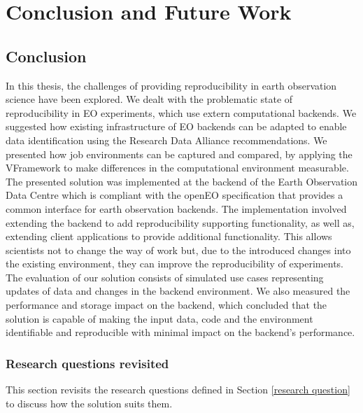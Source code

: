 \documentclass[draft,final]{vutinfth} %
\begin{document}
\chapter{Conclusion and Future Work}\label{Conclusion}

\section{Conclusion}

In this thesis, the challenges of providing reproducibility in earth observation science have been explored. We dealt with the problematic state of reproducibility in EO experiments, which use extern computational backends. We suggested how existing infrastructure of EO backends can be adapted to enable data identification using the Research Data Alliance recommendations. We presented how job environments can be captured and compared, by applying the VFramework to make differences in the computational environment measurable. The presented solution was implemented at the backend of the Earth Observation Data Centre which is compliant with the openEO specification that provides a common interface for earth observation backends. The implementation involved extending the backend to add reproducibility supporting functionality, as well as, extending client applications to provide additional functionality. This allows scientists not to change the way of work but, due to the introduced changes into the existing environment, they can improve the reproducibility of experiments. The evaluation of our solution consists of simulated use cases representing updates of data and changes in the backend environment. We also measured the performance and storage impact on the backend, which concluded that the solution is capable of making the input data, code and the environment identifiable and reproducible with minimal impact on the backend's performance.       
\newpage
\subsection{Research questions revisited}\label{research question revisited}
This section revisits the research questions defined in Section \ref{research question} to discuss how the solution suits them.
\end{document}
